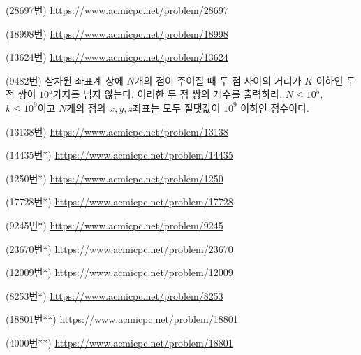 \begin{problem}
    (28697번) \url{https://www.acmicpc.net/problem/28697}
\end{problem}
\begin{problem}
    (18998번) \url{https://www.acmicpc.net/problem/18998}
\end{problem}
\begin{problem}
    (13624번) \url{https://www.acmicpc.net/problem/13624}
\end{problem}
\begin{problem}
    (9482번) 삼차원 좌표계 상에 $N$개의 점이 주어질 때 두 점 사이의 거리가 $K$ 이하인 두 점 쌍이 $10^5$가지를 넘지 않는다. 이러한 두 점 쌍의 개수를 출력하라. $N \leq 10^5$, $k \leq 10^9$이고 $N$개의 점의 $x, y, z$좌표는 모두 절댓값이 $10^9$ 이하인 정수이다.
\end{problem}
\begin{problem}
    (13138번) \url{https://www.acmicpc.net/problem/13138}
\end{problem}

\begin{problem}
    (14435번*) \url{https://www.acmicpc.net/problem/14435}
\end{problem}
\begin{problem}
    (1250번*) \url{https://www.acmicpc.net/problem/1250}
\end{problem}
\begin{problem}
    (17728번*) \url{https://www.acmicpc.net/problem/17728}
\end{problem}
\begin{problem}
    (9245번*) \url{https://www.acmicpc.net/problem/9245}
\end{problem}
\begin{problem}
    (23670번*) \url{https://www.acmicpc.net/problem/23670}
\end{problem}
\begin{problem}
    (12009번*) \url{https://www.acmicpc.net/problem/12009}
\end{problem}
\begin{problem}
    (8253번*) \url{https://www.acmicpc.net/problem/8253}
\end{problem}
\begin{problem}
    (18801번**) \url{https://www.acmicpc.net/problem/18801}
\end{problem}
\begin{problem}
    (4000번**) \url{https://www.acmicpc.net/problem/18801}
\end{problem}